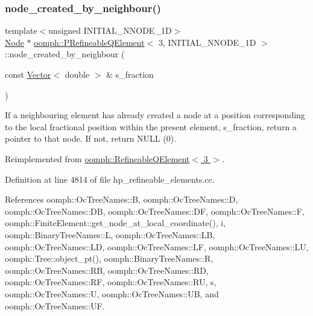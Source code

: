 \subsubsection{\texorpdfstring{node\+\_\+created\+\_\+by\+\_\+neighbour()}{node\_created\_by\_neighbour()}}
{\footnotesize\ttfamily template$<$unsigned I\+N\+I\+T\+I\+A\+L\+\_\+\+N\+N\+O\+D\+E\+\_\+1D$>$ \\
\hyperlink{classoomph_1_1Node}{Node} $\ast$ \hyperlink{classoomph_1_1PRefineableQElement}{oomph\+::\+P\+Refineable\+Q\+Element}$<$ 3, I\+N\+I\+T\+I\+A\+L\+\_\+\+N\+N\+O\+D\+E\+\_\+1D $>$\+::node\+\_\+created\+\_\+by\+\_\+neighbour (\begin{DoxyParamCaption}\item[{const \hyperlink{classoomph_1_1Vector}{Vector}$<$ double $>$ \&}]{s\+\_\+fraction }\end{DoxyParamCaption})\hspace{0.3cm}{\ttfamily [virtual]}}

If a neighbouring element has already created a node at a position corresponding to the local fractional position within the present element, s\+\_\+fraction, return a pointer to that node. If not, return N\+U\+LL (0). 

Reimplemented from \hyperlink{classoomph_1_1RefineableQElement_3_013_01_4_a3651ba128941c12c7da6521ae82af8ff}{oomph\+::\+Refineable\+Q\+Element$<$ 3 $>$}.



Definition at line 4814 of file hp\+\_\+refineable\+\_\+elements.\+cc.



References oomph\+::\+Oc\+Tree\+Names\+::B, oomph\+::\+Oc\+Tree\+Names\+::D, oomph\+::\+Oc\+Tree\+Names\+::\+DB, oomph\+::\+Oc\+Tree\+Names\+::\+DF, oomph\+::\+Oc\+Tree\+Names\+::F, oomph\+::\+Finite\+Element\+::get\+\_\+node\+\_\+at\+\_\+local\+\_\+coordinate(), i, oomph\+::\+Binary\+Tree\+Names\+::L, oomph\+::\+Oc\+Tree\+Names\+::\+LB, oomph\+::\+Oc\+Tree\+Names\+::\+LD, oomph\+::\+Oc\+Tree\+Names\+::\+LF, oomph\+::\+Oc\+Tree\+Names\+::\+LU, oomph\+::\+Tree\+::object\+\_\+pt(), oomph\+::\+Binary\+Tree\+Names\+::R, oomph\+::\+Oc\+Tree\+Names\+::\+RB, oomph\+::\+Oc\+Tree\+Names\+::\+RD, oomph\+::\+Oc\+Tree\+Names\+::\+RF, oomph\+::\+Oc\+Tree\+Names\+::\+RU, s, oomph\+::\+Oc\+Tree\+Names\+::U, oomph\+::\+Oc\+Tree\+Names\+::\+UB, and oomph\+::\+Oc\+Tree\+Names\+::\+UF.

\mbox{\label{classoomph_1_1PRefineableQElement_3_013_00_01INITIAL__NNODE__1D_01_4_aee94f17bdc0cf3de22308e57121866dd}} 
